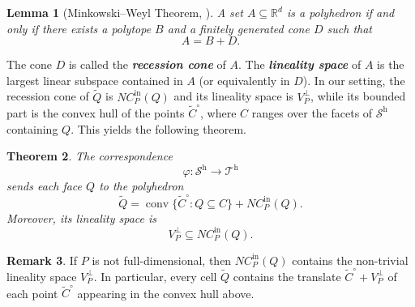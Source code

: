 \documentclass[12pt, reqno]{amsart}
\newcommand{\defn}[1]{{\color{blue!50!black}\textbf{\emph{#1}}}}
\newcommand{\h}{\operatorname{h}}
\theoremstyle{plain}
\newtheorem{theorem}{Theorem}[section]
\newtheorem{lemma}[theorem]{Lemma}
\theoremstyle{definition}
\newtheorem{remark}[theorem]{Remark}
\numberwithin{equation}{section}
\begin{document}
\begin{lemma}[Minkowski--Weyl Theorem, {\cite[Theorem~1.3]{ziegler_lectures_1995}}]
A set $A\subseteq\mathbb{R}^d$ is a polyhedron if and only if there exists a polytope $B$ and a finitely generated cone $D$ such that
\[
A=B+D.
\]
\end{lemma}

The cone $D$ is called the \defn{recession cone} of $A$. The \defn{lineality space} of $A$ is the largest linear subspace contained in $A$ (or equivalently in $D$). In our setting, the recession cone of $\widetilde{Q}$ is $NC_P^{\mathrm{in}}(Q)$ and its lineality space is $V_P^\perp$, while its bounded part is the convex hull of the points $\widetilde{C}^\circ$, where $C$ ranges over the facets of $\mathcal{S}^{\h}$ containing $Q$. This yields the following theorem.

\begin{theorem}\label{thm_trop_cells}
The correspondence
\[
\varphi:\mathcal{S}^{\h}\longrightarrow\mathcal{T}^{\h}
\]
sends each face $Q$ to the polyhedron
\[
\widetilde{Q}
=
\operatorname{conv}\{\widetilde{C}^\circ:Q\subseteq C\}
+
NC_P^{\mathrm{in}}(Q).
\]
Moreover, its lineality space is
\[
V_P^\perp \subseteq NC_P^{\mathrm{in}}(Q).
\]
\end{theorem}

\begin{remark}
If $P$ is not full-dimensional, then $NC_P^{\mathrm{in}}(Q)$ contains the non-trivial lineality space $V_P^\perp$. In particular, every cell $\widetilde{Q}$ contains the translate $\widetilde{C}^\circ+V_P^\perp$ of each point $\widetilde{C}^\circ$ appearing in the convex hull above.
\end{remark}
\end{document}
